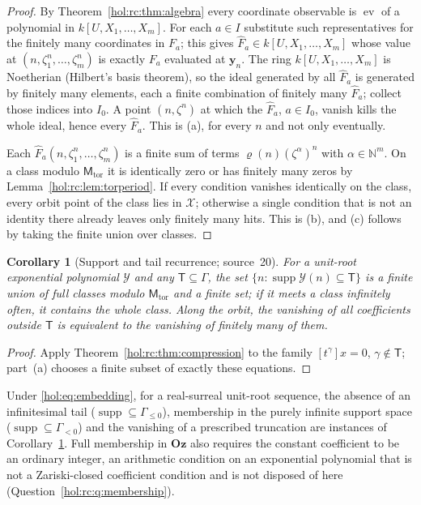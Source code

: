 \documentclass[11pt]{article}
\numberwithin{equation}{section}
\newtheorem{corollary}[theorem]{Corollary}
\theoremstyle{definition}
\theoremstyle{remark}
\newcommand{\N}{\mathbb N}
\newcommand{\supp}{\operatorname{supp}}
\newcommand{\Oz}{\mathbf{Oz}}
\begin{document}
\begin{proof}
By Theorem~\ref{hol:rc:thm:algebra} every coordinate observable is
$\operatorname{ev}$ of a polynomial in $k[U,X_1,\ldots,X_m]$. For each $a\in I$
substitute such representatives for the finitely many coordinates in $F_a$;
this gives $\widehat F_a\in k[U,X_1,\ldots,X_m]$ whose value at
$(n,\zeta_1^n,\ldots,\zeta_m^n)$ is exactly $F_a$ evaluated at $\mathbf y_n$.
The ring $k[U,X_1,\ldots,X_m]$ is Noetherian (Hilbert's basis theorem), so the
ideal generated by all $\widehat F_a$ is generated by finitely many elements,
each a finite combination of finitely many $\widehat F_a$; collect those
indices into $I_0$. A point $(n,\zeta^n)$ at which the $\widehat F_a$,
$a\in I_0$, vanish kills the whole ideal, hence every $\widehat F_a$. This is
(a), for every $n$ and not only eventually.

Each $\widehat F_a(n,\zeta_1^n,\ldots,\zeta_m^n)$ is a finite sum of terms
$\varrho(n)(\zeta^\alpha)^n$ with $\alpha\in\N^m$. On a class modulo
$\mathsf M_{\mathrm{tor}}$ it is identically zero or has finitely many zeros by
Lemma~\ref{hol:rc:lem:torperiod}. If every condition vanishes identically on
the class, every orbit point of the class lies in $\mathcal X$; otherwise a
single condition that is not an identity there already leaves only finitely
many hits. This is (b),
and (c) follows by taking the finite union over classes.
\end{proof}

\begin{corollary}[Support and tail recurrence; source~20]
\label{hol:rc:cor:tails}
For a unit-root exponential polynomial $\mathcal Y$ and any
$\mathsf T\subseteq\Gamma$, the set $\{n:\supp\mathcal Y(n)\subseteq\mathsf
T\}$ is a finite union of full classes modulo $\mathsf M_{\mathrm{tor}}$ and a
finite set; if it meets a class infinitely often, it contains the whole
class. Along the orbit, the vanishing of all coefficients outside
$\mathsf T$ is equivalent to the vanishing of finitely many of them.
\end{corollary}

\begin{proof}
Apply Theorem~\ref{hol:rc:thm:compression} to the family $[t^\gamma]x=0$,
$\gamma\notin\mathsf T$; part~(a) chooses a finite subset of exactly these
equations.
\end{proof}

Under \eqref{hol:eq:embedding}, for a real-surreal unit-root sequence, the
absence of an infinitesimal tail ($\supp\subseteq\Gamma_{\le0}$), membership
in the purely infinite support space ($\supp\subseteq\Gamma_{<0}$) and the
vanishing of a prescribed truncation are instances of
Corollary~\ref{hol:rc:cor:tails}. Full membership in $\Oz$ also requires the
constant coefficient to be an ordinary integer, an arithmetic condition on an
exponential polynomial that is not a Zariski-closed coefficient condition and
is not disposed of here (Question~\ref{hol:rc:q:membership}).
\end{document}
